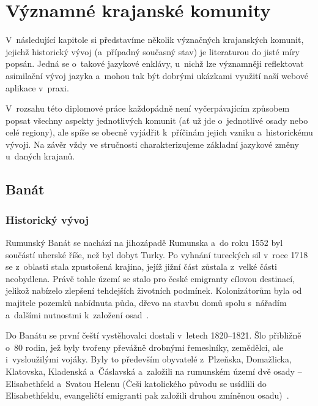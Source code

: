\hypertarget{vuxfdznamnuxe9-krajanskuxe9-komunity}{%
\chapter{Významné krajanské komunity}\label{vuxfdznamnuxe9-krajanskuxe9-komunity}}

V~následující kapitole si představíme několik význačných krajanských komunit, jejichž historický vývoj (a~případný současný stav) je literaturou do jisté míry popsán. Jedná se o~takové jazykové enklávy, u~nichž lze významněji reflektovat asimilační vývoj jazyka a~mohou tak být dobrými ukázkami využití naší webové aplikace v~praxi.

V~rozsahu této diplomové práce každopádně není vyčerpávajícím způsobem popsat všechny aspekty jednotlivých komunit (ať už jde o~jednotlivé osady nebo celé regiony), ale spíše se obecně vyjádřit k~příčinám jejich vzniku a~historickému vývoji. Na závěr vždy ve stručnosti charakterizujeme základní jazykové změny u~daných krajanů.

\hypertarget{banuxe1t}{%
\section{Banát}\label{banuxe1t}}

\hypertarget{historickuxfd-vuxfdvoj}{%
\subsection*{Historický vývoj}\label{historickuxfd-vuxfdvoj}}

Rumunský Banát se nachází na jihozápadě Rumunska a~do roku 1552 byl součástí uherské říše, než byl dobyt Turky. Po vyhnání tureckých sil v~roce 1718 se z~oblasti stala zpustošená krajina, jejíž jižní část zůstala z~velké části neobydlena. Právě tohle území se stalo pro české emigranty cílovou destinací, jelikož nabízelo zlepšení tehdejších životních podmínek. Kolonizátorům byla od majitele pozemků nabídnuta půda, dřevo na stavbu domů spolu s~nářadím a~dalšími nutnostmi k~založení osad~\parencite{Secka1995}.

Do Banátu se první čeští vystěhovalci dostali v~letech 1820--1821. Šlo přibližně o~80 rodin, jež byly tvořeny převážně drobnými řemeslníky, zemědělci, ale i~vysloužilými vojáky. Byly to především obyvatelé z~Plzeňska, Domažlicka, Klatovska, Kladenská a~Čáslavská a~založili na rumunském území dvě osady -- Elisabethfeld a~Svatou Helenu (Češi katolického původu se usídlili do Elisabethfeldu, evangeličtí emigranti pak založili druhou zmíněnou osadu)~\parencite{Gecse2013}.

